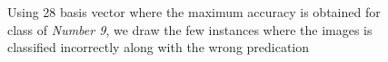 \begin{figure}[!tbh]
   \caption[]{Using 28 basis vector where the maximum accuracy is obtained for class of \textit{Number 9}, we draw the few instances where the images is classified incorrectly along with the wrong predication}
   \label{fig:nine}
\end{figure}




